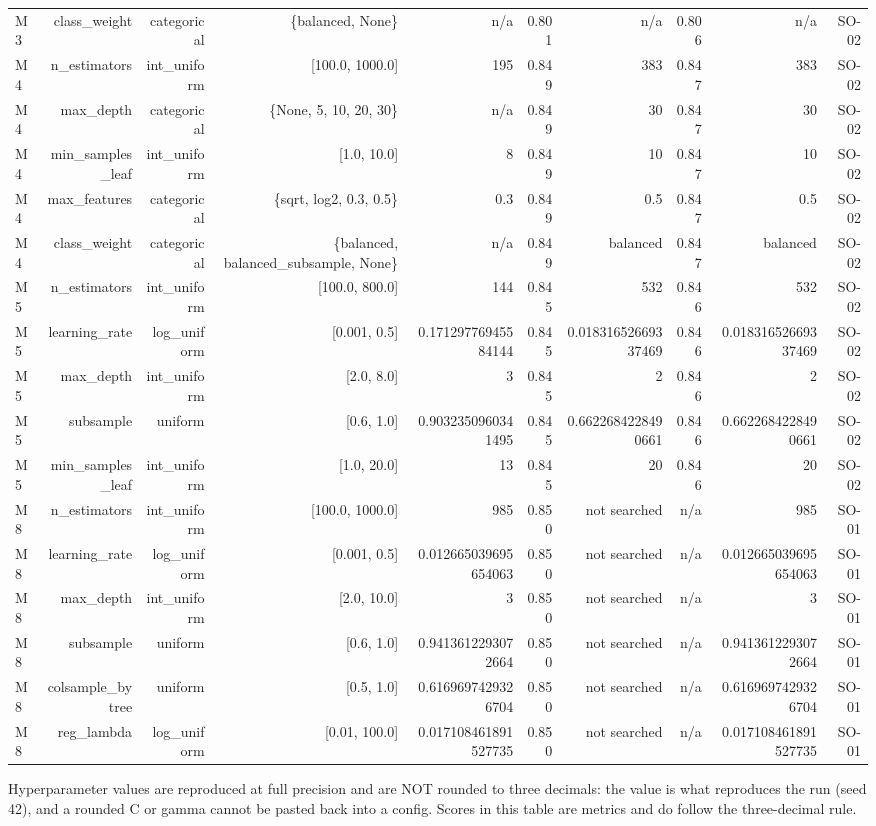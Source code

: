 \begin{table}[htbp]
\begin{tabular}{lrrrrrrrrr}
    M3 & class\_weight & categorical & \{balanced, None\} & n/a & 0.801 & n/a & 0.806 & n/a & SO-02 \\
    M4 & n\_estimators & int\_uniform & [100.0, 1000.0] & 195 & 0.849 & 383 & 0.847 & 383 & SO-02 \\
    M4 & max\_depth & categorical & \{None, 5, 10, 20, 30\} & n/a & 0.849 & 30 & 0.847 & 30 & SO-02 \\
    M4 & min\_samples\_leaf & int\_uniform & [1.0, 10.0] & 8 & 0.849 & 10 & 0.847 & 10 & SO-02 \\
    M4 & max\_features & categorical & \{sqrt, log2, 0.3, 0.5\} & 0.3 & 0.849 & 0.5 & 0.847 & 0.5 & SO-02 \\
    M4 & class\_weight & categorical & \{balanced, balanced\_subsample, None\} & n/a & 0.849 & balanced & 0.847 & balanced & SO-02 \\
    M5 & n\_estimators & int\_uniform & [100.0, 800.0] & 144 & 0.845 & 532 & 0.846 & 532 & SO-02 \\
    M5 & learning\_rate & log\_uniform & [0.001, 0.5] & 0.17129776945584144 & 0.845 & 0.01831652669337469 & 0.846 & 0.01831652669337469 & SO-02 \\
    M5 & max\_depth & int\_uniform & [2.0, 8.0] & 3 & 0.845 & 2 & 0.846 & 2 & SO-02 \\
    M5 & subsample & uniform & [0.6, 1.0] & 0.9032350960341495 & 0.845 & 0.6622684228490661 & 0.846 & 0.6622684228490661 & SO-02 \\
    M5 & min\_samples\_leaf & int\_uniform & [1.0, 20.0] & 13 & 0.845 & 20 & 0.846 & 20 & SO-02 \\
    M8 & n\_estimators & int\_uniform & [100.0, 1000.0] & 985 & 0.850 & not searched & n/a & 985 & SO-01 \\
    M8 & learning\_rate & log\_uniform & [0.001, 0.5] & 0.012665039695654063 & 0.850 & not searched & n/a & 0.012665039695654063 & SO-01 \\
    M8 & max\_depth & int\_uniform & [2.0, 10.0] & 3 & 0.850 & not searched & n/a & 3 & SO-01 \\
    M8 & subsample & uniform & [0.6, 1.0] & 0.9413612293072664 & 0.850 & not searched & n/a & 0.9413612293072664 & SO-01 \\
    M8 & colsample\_bytree & uniform & [0.5, 1.0] & 0.6169697429326704 & 0.850 & not searched & n/a & 0.6169697429326704 & SO-01 \\
    M8 & reg\_lambda & log\_uniform & [0.01, 100.0] & 0.017108461891527735 & 0.850 & not searched & n/a & 0.017108461891527735 & SO-01 \\
    \bottomrule
  \end{tabular}
  \par\footnotesize Hyperparameter values are reproduced at full precision and are NOT rounded to three decimals: the value is what reproduces the run (seed 42), and a rounded C or gamma cannot be pasted back into a config. Scores in this table are metrics and do follow the three-decimal rule.
\end{table}
